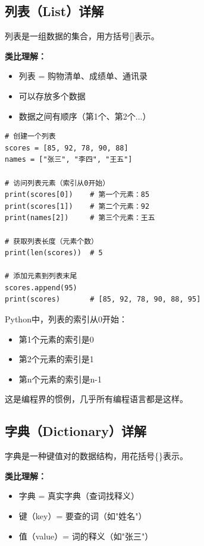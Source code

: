 \documentclass[12pt,a4paper]{article}
\begin{document}
\subsection{列表（List）详解}

\begin{knowledgebox}[什么是列表？]
列表是一组数据的集合，用方括号[]表示。

\textbf{类比理解：}
\begin{itemize}
    \item 列表 = 购物清单、成绩单、通讯录
    \item 可以存放多个数据
    \item 数据之间有顺序（第1个、第2个...）
\end{itemize}
\end{knowledgebox}

\begin{lstlisting}[caption={列表示例}]
# 创建一个列表
scores = [85, 92, 78, 90, 88]
names = ["张三", "李四", "王五"]

# 访问列表元素（索引从0开始）
print(scores[0])    # 第一个元素：85
print(scores[1])    # 第二个元素：92
print(names[2])     # 第三个元素：王五

# 获取列表长度（元素个数）
print(len(scores))  # 5

# 添加元素到列表末尾
scores.append(95)
print(scores)       # [85, 92, 78, 90, 88, 95]
\end{lstlisting}

\begin{tipbox}[索引从0开始]
Python中，列表的索引从0开始：
\begin{itemize}
    \item 第1个元素的索引是0
    \item 第2个元素的索引是1
    \item 第n个元素的索引是n-1
\end{itemize}

这是编程界的惯例，几乎所有编程语言都是这样。
\end{tipbox}

\subsection{字典（Dictionary）详解}

\begin{knowledgebox}[什么是字典？]
字典是一种键值对的数据结构，用花括号\{\}表示。

\textbf{类比理解：}
\begin{itemize}
    \item 字典 = 真实字典（查词找释义）
    \item 键（key）= 要查的词（如"姓名"）
    \item 值（value）= 词的释义（如"张三"）
\end{itemize}
\end{knowledgebox}
\end{document}
